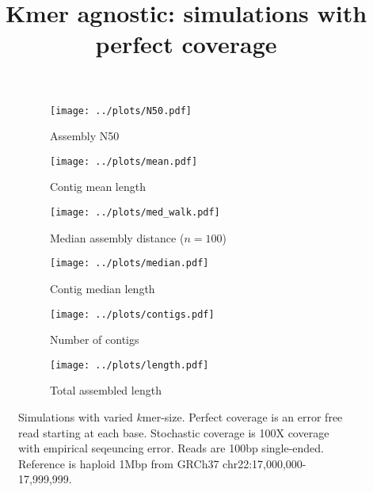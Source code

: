 \documentclass{article}
\title{Kmer agnostic: simulations with perfect coverage}
\begin{document}
\begin{figure}[ht]
\begin{subfigure}{.5\textwidth}
  \centering
  \caption{Assembly N50}
  \texttt{[image: ../plots/N50.pdf]}
\end{subfigure}
\begin{subfigure}{.5\textwidth}
  \centering
  \caption{Contig mean length}
  \texttt{[image: ../plots/mean.pdf]}
\end{subfigure}

\begin{subfigure}{.5\textwidth}
  \centering
  \caption{Median assembly distance ($n=100$)}
  \texttt{[image: ../plots/med\_walk.pdf]}
\end{subfigure}
\begin{subfigure}{.5\textwidth}
  \centering
  \caption{Contig median length}
  \texttt{[image: ../plots/median.pdf]}
\end{subfigure}

\begin{subfigure}{.5\textwidth}
  \centering
  \caption{Number of contigs}
  \texttt{[image: ../plots/contigs.pdf]}
\end{subfigure}
\begin{subfigure}{.5\textwidth}
  \centering
  \caption{Total assembled length}
  \texttt{[image: ../plots/length.pdf]}
\end{subfigure}
\caption{Simulations with varied $k$mer-size. Perfect coverage is an error free read starting at each base. Stochastic coverage is 100X coverage with empirical seqeuncing error. Reads are 100bp single-ended. Reference is haploid 1Mbp from GRCh37 chr22:17,000,000-17,999,999.}
\label{fig:kmer_agnostic}
\end{figure}
\end{document}
